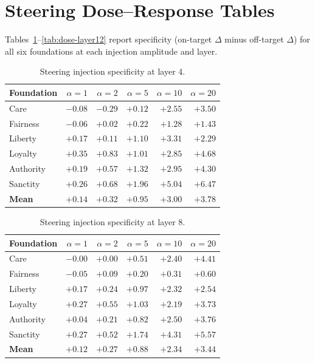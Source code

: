 \section{Steering Dose--Response Tables}
\label{app:dose-response}

Tables~\ref{tab:dose-layer4}--\ref{tab:dose-layer12} report specificity (on-target $\Delta$ minus off-target $\Delta$) for all six foundations at each injection amplitude and layer.

\begin{table}[h]
\centering
\small
\begin{tabular}{l rrrrr}
\toprule
Foundation & $\alpha{=}1$ & $\alpha{=}2$ & $\alpha{=}5$ & $\alpha{=}10$ & $\alpha{=}20$ \\
\midrule
Care      & $-0.08$ & $-0.29$ & $+0.12$ & $+2.55$ & $+3.50$ \\
Fairness  & $-0.06$ & $+0.02$ & $+0.22$ & $+1.28$ & $+1.43$ \\
Liberty   & $+0.17$ & $+0.11$ & $+1.10$ & $+3.31$ & $+2.29$ \\
Loyalty   & $+0.35$ & $+0.83$ & $+1.01$ & $+2.85$ & $+4.68$ \\
Authority & $+0.19$ & $+0.57$ & $+1.32$ & $+2.95$ & $+4.30$ \\
Sanctity  & $+0.26$ & $+0.68$ & $+1.96$ & $+5.04$ & $+6.47$ \\
\midrule
\textbf{Mean} & $+0.14$ & $+0.32$ & $+0.95$ & $+3.00$ & $+3.78$ \\
\bottomrule
\end{tabular}
\caption{Steering injection specificity at layer 4.}
\label{tab:dose-layer4}
\end{table}

\begin{table}[h]
\centering
\small
\begin{tabular}{l rrrrr}
\toprule
Foundation & $\alpha{=}1$ & $\alpha{=}2$ & $\alpha{=}5$ & $\alpha{=}10$ & $\alpha{=}20$ \\
\midrule
Care      & $-0.00$ & $+0.00$ & $+0.51$ & $+2.40$ & $+4.41$ \\
Fairness  & $-0.05$ & $+0.09$ & $+0.20$ & $+0.31$ & $+0.60$ \\
Liberty   & $+0.17$ & $+0.24$ & $+0.97$ & $+2.32$ & $+2.54$ \\
Loyalty   & $+0.27$ & $+0.55$ & $+1.03$ & $+2.19$ & $+3.73$ \\
Authority & $+0.04$ & $+0.21$ & $+0.82$ & $+2.50$ & $+3.76$ \\
Sanctity  & $+0.27$ & $+0.52$ & $+1.74$ & $+4.31$ & $+5.57$ \\
\midrule
\textbf{Mean} & $+0.12$ & $+0.27$ & $+0.88$ & $+2.34$ & $+3.44$ \\
\bottomrule
\end{tabular}
\caption{Steering injection specificity at layer 8.}
\label{tab:dose-layer8}
\end{table}

